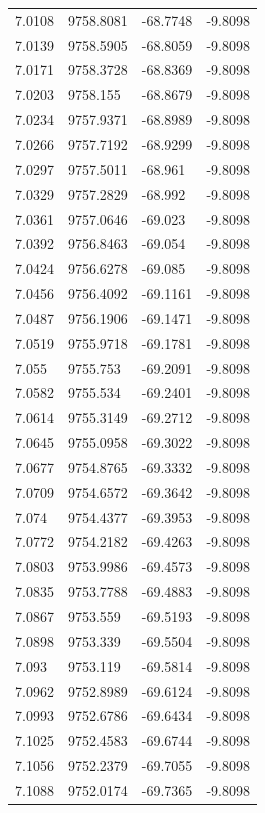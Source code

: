 \begin{table}[H]
\begin{tabular}{llll}
7.0108 & 9758.8081 & -68.7748 & -9.8098 \\
7.0139 & 9758.5905 & -68.8059 & -9.8098 \\
7.0171 & 9758.3728 & -68.8369 & -9.8098 \\
7.0203 & 9758.155 & -68.8679 & -9.8098 \\
7.0234 & 9757.9371 & -68.8989 & -9.8098 \\
7.0266 & 9757.7192 & -68.9299 & -9.8098 \\
7.0297 & 9757.5011 & -68.961 & -9.8098 \\
7.0329 & 9757.2829 & -68.992 & -9.8098 \\
7.0361 & 9757.0646 & -69.023 & -9.8098 \\
7.0392 & 9756.8463 & -69.054 & -9.8098 \\
7.0424 & 9756.6278 & -69.085 & -9.8098 \\
7.0456 & 9756.4092 & -69.1161 & -9.8098 \\
7.0487 & 9756.1906 & -69.1471 & -9.8098 \\
7.0519 & 9755.9718 & -69.1781 & -9.8098 \\
7.055 & 9755.753 & -69.2091 & -9.8098 \\
7.0582 & 9755.534 & -69.2401 & -9.8098 \\
7.0614 & 9755.3149 & -69.2712 & -9.8098 \\
7.0645 & 9755.0958 & -69.3022 & -9.8098 \\
7.0677 & 9754.8765 & -69.3332 & -9.8098 \\
7.0709 & 9754.6572 & -69.3642 & -9.8098 \\
7.074 & 9754.4377 & -69.3953 & -9.8098 \\
7.0772 & 9754.2182 & -69.4263 & -9.8098 \\
7.0803 & 9753.9986 & -69.4573 & -9.8098 \\
7.0835 & 9753.7788 & -69.4883 & -9.8098 \\
7.0867 & 9753.559 & -69.5193 & -9.8098 \\
7.0898 & 9753.339 & -69.5504 & -9.8098 \\
7.093 & 9753.119 & -69.5814 & -9.8098 \\
7.0962 & 9752.8989 & -69.6124 & -9.8098 \\
7.0993 & 9752.6786 & -69.6434 & -9.8098 \\
7.1025 & 9752.4583 & -69.6744 & -9.8098 \\
7.1056 & 9752.2379 & -69.7055 & -9.8098 \\
7.1088 & 9752.0174 & -69.7365 & -9.8098 \\

\end{tabular}
\end{table}
